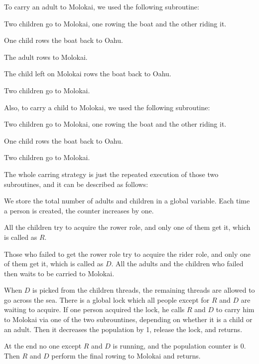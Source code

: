 \documentclass{article}
\begin{document}
\begin{spacing}{1.1}
To carry an adult to Molokai, we used the following subroutine:\\
\begin{asparaitem}
  \item Two children go to Molokai, one rowing the boat and the other riding it.\\
  \item One child rows the boat back to Oahu.\\
  \item The adult rows to Molokai.\\
  \item The child left on Molokai rows the boat back to Oahu.\\
  \item Two children go to Molokai.\\
\end{asparaitem}

Also, to carry a child to Molokai, we used the following subroutine:
\begin{asparaitem}
  \item Two children go to Molokai, one rowing the boat and the other riding it.\\
  \item One child rows the boat back to Oahu.\\
  \item Two children go to Molokai.\\
\end{asparaitem}

The whole carring strategy is just the repeated execution of those two subroutines, and it can be described as follows:

\begin{asparaitem}
  \item We store the total number of adults and children in a global variable. Each time a person is created, the counter increases by one.\\
  \item All the children try to acquire the rower role, and only one of them get it, which is called as $R$.\\
  \item Those who failed to get the rower role try to acquire the rider role, and only one of them get it, which is  called as $D$. All the adults and the children who failed then waits to be carried to Molokai.\\
  \item When $D$ is picked from the children threads, the remaining threads are allowed to go across the sea. There is a global lock which all people except for $R$ and $D$ are waiting to acquire. If one person acquired the lock, he calls $R$ and $D$ to carry him to Molokai via one of the two subrountines, depending on whether it is a child or an adult. Then it decreases the population by 1, release the lock, and returns.\\
  \item At the end no one except $R$ and $D$ is running, and the population counter is 0. Then $R$ and $D$ perform the final rowing to Molokai and returns.
\end{asparaitem}


\end{spacing}
\end{document}
